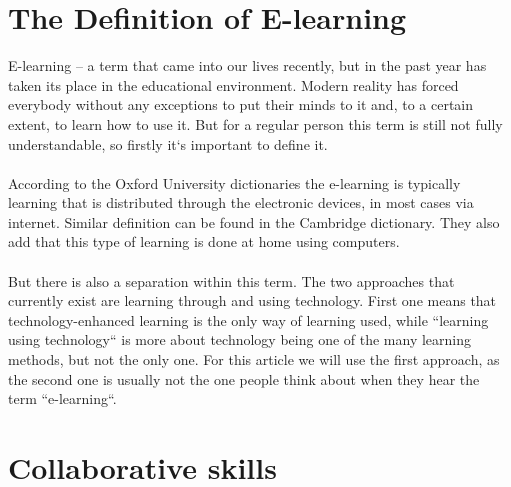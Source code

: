 \documentclass[10pt,oneside,english,a4paper]{article}
\begin{document}
\section{The Definition of E-learning} \label{definition}

E-learning – a term that came into our lives recently, but in the past year has taken its place in the educational environment. Modern reality has forced everybody without any exceptions to put their minds to it and, to a certain extent, to learn how to use it. But for a regular person this term is still not fully understandable, so firstly it`s important to define it.\paragraph{}
According to the Oxford University dictionaries the e-learning is typically learning that is distributed through the electronic devices, in most cases via internet. Similar definition can be found in the Cambridge dictionary. They also add that this type of learning is done at home using computers.\paragraph{}
But there is also a separation within this term. The two approaches that currently exist are learning through and using technology. First one means that technology-enhanced learning is the only way of learning used, while ``learning using technology`` is more about technology being one of the many learning methods, but not the only one. For this article we will use the first approach, as the second one is usually not the one people think about when they hear the term ``e-learning``.

\section{Collaborative skills} \label{collab}
\end{document}
